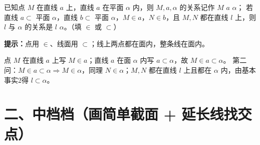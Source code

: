 \documentclass{exam-zh}
\begin{document}
\begin{question}[points=6]
  已知点 $M$ 在直线 $a$ 上，直线 $a$ 在平面 $\alpha$ 内，则 $M,a,\alpha$ 的关系记作 $M$ \underline{\quad} $a$ \underline{\quad} $\alpha$；
若直线 $a\subset$ 平面 $\alpha$，直线 $b\subset$ 平面 $\alpha$，$M\in a$，$N\in b$，且 $M,N$ 都在直线 $l$ 上，则 $l$ 与 $\alpha$ 的关系是 $l$ \underline{\quad} $\alpha$。（填 $\in$ 或 $\subset$）
  \begin{hintbox}
\textbf{提示：}点用 $\in$、线面用 $\subset$；线上两点都在面内，整条线在面内。\end{hintbox}

  \begin{solutionblock}
    点 $M$ 在直线 $a$ 上写 $M\in a$；直线 $a$ 在面 $\alpha$ 内写 $a\subset\alpha$，故 $M\in a\subset\alpha$。
第二问：$M\in a\subset\alpha\Rightarrow M\in\alpha$，同理 $N\in\alpha$；$M,N$ 都在直线 $l$ 上且都在 $\alpha$ 内，由基本事实2得 $l\subset\alpha$。
  \end{solutionblock}
\end{question}


\section*{二、中档档（画简单截面 + 延长线找交点）}

\end{document}
